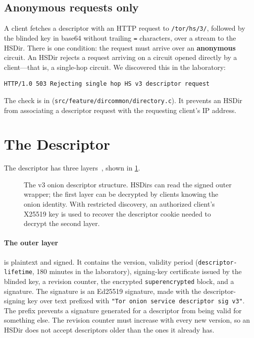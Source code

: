 \subsection{Anonymous requests only}

A client fetches a descriptor with an HTTP request to \nolinkurl{/tor/hs/3/}, followed by the blinded key in base64 without trailing \texttt{=} characters, over a  stream to the HSDir. There is one condition: the request must arrive over an \textbf{anonymous} circuit. An HSDir rejects a request arriving on a circuit opened directly by a client---that is, a single-hop circuit. We discovered this in the laboratory:
\begin{lstlisting}[numbers=none]
HTTP/1.0 503 Rejecting single hop HS v3 descriptor request
\end{lstlisting}
The check is in  (\nolinkurl{src/feature/dircommon/directory.c}). It prevents an HSDir from associating a descriptor request with the requesting client's IP address.

\section{The Descriptor}\label{sec:os-descrittore}

The descriptor has three layers~, shown in \cref{fig:os-descrittore}.

\begin{figure}[htbp]
\centering

\caption{The v3 onion descriptor structure. HSDirs can read the signed outer wrapper; the first layer can be decrypted by clients knowing the onion identity. With restricted discovery, an authorized client's X25519 key is used to recover the descriptor cookie needed to decrypt the second layer.}
\label{fig:os-descrittore}
\end{figure}

\paragraph{The outer layer} is plaintext and signed. It contains the version, validity period (\texttt{descriptor-lifetime}, 180 minutes in the laboratory), signing-key certificate issued by the blinded key, a revision counter, the encrypted \texttt{superencrypted} block, and a signature. The signature is an Ed25519 signature, made with the descriptor-signing key over text prefixed with \texttt{"Tor onion service descriptor sig v3"}. The prefix prevents a signature generated for a descriptor from being valid for something else. The revision counter must increase with every new version, so an HSDir does not accept descriptors older than the ones it already has.


